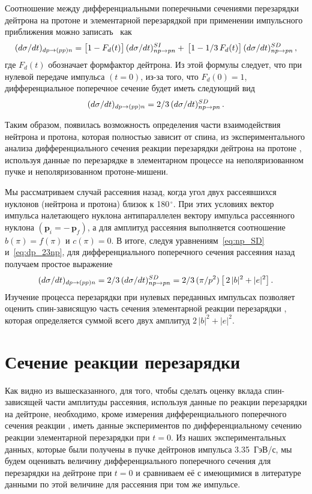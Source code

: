 Соотношение между дифференциальными поперечными сечениями перезарядки дейтрона
на протоне \dpchex и элементарной перезарядкой \np при применении импульсного
приближения можно записать~\cite{dean72_2} как
\begin{equation}
  (d\sigma/dt)_{dp \rightarrow (pp)n} = \bigl[1 - F_d(t)\bigr]\,(d\sigma/dt)^{SI}_{np \rightarrow pn} +\,
  \bigl[1 - 1/3\,F_d(t)\bigr]\,(d\sigma/dt)^{SD}_{np \rightarrow pn}\,,
\end{equation}
где $F_d(t)$ обозначает формфактор дейтрона. Из этой формулы следует, что при
нулевой передаче импульса $(t=0)$, из-за того, что $F_d(0) = 1$,
дифференциальное поперечное сечение будет иметь следующий вид
\begin{equation}
  \label{eq:dp_23np}
  (d\sigma/dt)_{dp \rightarrow (pp)n} = 2/3\,(d\sigma/dt)^{SD}_{np \rightarrow pn}\,.
\end{equation}

Таким образом, появилась возможность определения части взаимодействия нейтрона и
протона, которая полностью зависит от спина, из экспериментального анализа
дифференциального сечения реакции перезарядки дейтрона на протоне \dpchex ,
используя данные по перезарядке в элементарном процессе \np на неполяризованном
пучке и неполяризованном протоне-мишени.

Мы рассматриваем случай рассеяния назад, когда угол двух рассеявшихся нуклонов
(нейтрона и протона) близок к 180$^{\,\circ}$. При этих условиях вектор импульса
налетающего нуклона антипараллелен вектору импульса рассеянного нуклона
$(\mathbf{p}_i = -\,\mathbf{p}_f)$, а для амплитуд рассеяния выполняется
соотношение $b(\pi) = f(\pi)$ и $c(\pi) = 0$.  В итоге, следуя
уравнениям~\eqref{eq:np_SD} и~\eqref{eq:dp_23np}, для дифференциального
поперечного сечения \np рассеяния назад получаем простое выражение
\begin{equation}
  (d\sigma/dt)_{dp \rightarrow (pp)n} = 2/3\,(d\sigma/dt)^{SD}_{np \rightarrow pn} =
  2/3\,(\pi/p^2)\,\bigl[\,2\,|b|^2 + |e|^2\bigr]\,.
\end{equation}
Изучение процесса перезарядки \dpchex при нулевых переданных импульсах позволяет
оценить спин-зависящую часть сечения элементарной реакции перезарядки \np,
которая определяется суммой всего двух амплитуд $2\,|b|^2 + |e|^2$.

\section{Сечение реакции перезарядки \maybebm{{\np}}}
\label{section:npnp}
Как видно из вышесказанного, для того, чтобы сделать оценку вклада
спин-зависящей части амплитуды \np рассеяния, используя данные по реакции
перезарядки на дейтроне, необходимо, кроме измерения дифференциального
поперечного сечения реакции \dpchex, иметь данные экспериментов по
дифференциальному сечению реакции элементарной перезарядки \np при $t=0$.
Из наших экспериментальных данных, которые были получены в пучке дейтронов
импульса 3.35~ГэВ/с, мы будем оценивать величину дифференциального поперечного
сечения для перезарядки на дейтроне при $t=0$ и сравниваем её с имеющимися в
литературе данными по этой величине для \np рассеяния при том же импульсе.

